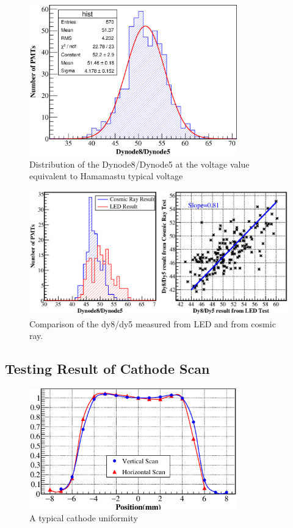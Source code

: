 \documentclass[5p, times]{elsarticle}
\begin{document}
\begin{figure}[h!]
 \centering
 \includegraphics[width=90mm]{dy58_dist}
\caption{Distribution of the Dynode8/Dynode5 at the voltage value equivalent to Hamamastu typical voltage}
\label{fig:dy58_dist}
\end{figure} 

\begin{figure}[t]
 \centering
 \includegraphics[width=140mm]{dy58_ledvscm}
\caption{Comparison of the dy8/dy5 measured from LED and from cosmic ray.}
\label{fig:dy58_ledvscm}
\end{figure} 

\subsection{Testing Result of Cathode Scan}
\label{sec:psd_cathodescan}

\begin{figure}[h!]
 \centering
 \includegraphics[width=90mm]{cathode_uniformity}
\caption{A typical cathode uniformity}
\label{fig:cathode_uniformity}
\end{figure} 
\end{document}
